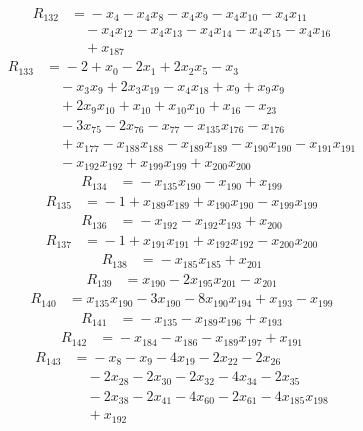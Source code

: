 \begin{align*}
R_{132}&={}-x_{4} -x_{4}x_{8} -x_{4}x_{9} -x_{4}x_{10} -x_{4}x_{11}\\
&\quad{}-x_{4}x_{12} -x_{4}x_{13} -x_{4}x_{14} -x_{4}x_{15} -x_{4}x_{16}\\
&\quad{}+x_{187}
\end{align*}
\begin{align*}
R_{133}&={}-2 +x_{0} -2x_{1} +2x_{2}x_{5} -x_{3}\\
&\quad{}-x_{3}x_{9} +2x_{3}x_{19} -x_{4}x_{18} +x_{9} +x_{9}x_{9}\\
&\quad{}+2x_{9}x_{10} +x_{10} +x_{10}x_{10} +x_{16} -x_{23}\\
&\quad{}-3x_{75} -2x_{76} -x_{77} -x_{135}x_{176} -x_{176}\\
&\quad{}+x_{177} -x_{188}x_{188} -x_{189}x_{189} -x_{190}x_{190} -x_{191}x_{191}\\
&\quad{}-x_{192}x_{192} +x_{199}x_{199} +x_{200}x_{200}
\end{align*}
\begin{align*}
R_{134}&={}-x_{135}x_{190} -x_{190} +x_{199}
\end{align*}
\begin{align*}
R_{135}&={}-1 +x_{189}x_{189} +x_{190}x_{190} -x_{199}x_{199}
\end{align*}
\begin{align*}
R_{136}&={}-x_{192} -x_{192}x_{193} +x_{200}
\end{align*}
\begin{align*}
R_{137}&={}-1 +x_{191}x_{191} +x_{192}x_{192} -x_{200}x_{200}
\end{align*}
\begin{align*}
R_{138}&={}-x_{185}x_{185} +x_{201}
\end{align*}
\begin{align*}
R_{139}&={}x_{190} -2x_{195}x_{201} -x_{201}
\end{align*}
\begin{align*}
R_{140}&={}x_{135}x_{190} -3x_{190} -8x_{190}x_{194} +x_{193} -x_{199}
\end{align*}
\begin{align*}
R_{141}&={}-x_{135} -x_{189}x_{196} +x_{193}
\end{align*}
\begin{align*}
R_{142}&={}-x_{184} -x_{186} -x_{189}x_{197} +x_{191}
\end{align*}
\begin{align*}
R_{143}&={}-x_{8} -x_{9} -4x_{19} -2x_{22} -2x_{26}\\
&\quad{}-2x_{28} -2x_{30} -2x_{32} -4x_{34} -2x_{35}\\
&\quad{}-2x_{38} -2x_{41} -4x_{60} -2x_{61} -4x_{185}x_{198}\\
&\quad{}+x_{192}
\end{align*}
